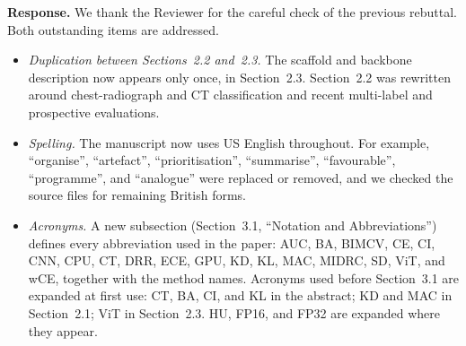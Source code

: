 \documentclass[11pt]{article}
\begin{document}
\textbf{Response.} We thank the Reviewer for the careful check of the
previous rebuttal. Both outstanding items are addressed.
\begin{itemize}[leftmargin=1.4em]
  \item \emph{Duplication between Sections~2.2 and~2.3.} The scaffold and backbone description now appears only once, in Section~2.3. Section~2.2 was rewritten around chest-radiograph and CT classification and recent multi-label and prospective evaluations.
  \item \emph{Spelling.} The manuscript now uses US English throughout. For example, ``organise'', ``artefact'', ``prioritisation'', ``summarise'', ``favourable'', ``programme'', and ``analogue'' were replaced or removed, and we checked the source files for remaining British forms.
  \item \emph{Acronyms.} A new subsection (Section~3.1, ``Notation and Abbreviations'') defines every abbreviation used in the paper: AUC, BA, BIMCV, CE, CI, CNN, CPU, CT, DRR, ECE, GPU, KD, KL, MAC, MIDRC, SD, ViT, and wCE, together with the method names. Acronyms used before Section~3.1 are expanded at first use: CT, BA, CI, and KL in the abstract; KD and MAC in Section~2.1; ViT in Section~2.3. HU, FP16, and FP32 are expanded where they appear.
\end{itemize}
\end{document}
